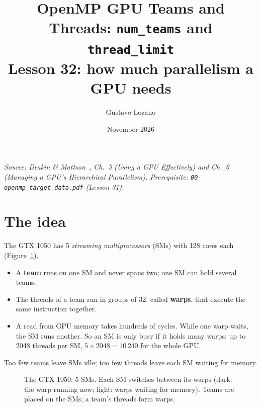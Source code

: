 \documentclass[11pt,a4paper]{article}
\title{\textbf{OpenMP GPU Teams and Threads: \texttt{num\_teams} and \texttt{thread\_limit}}\\[4pt]\large Lesson 32: how much parallelism a GPU needs}
\author{Gustavo Lozano}
\date{November 2026}
\let\origtexttt\texttt
\renewcommand{\texttt}[1]{\textcolor{black!60}{\origtexttt{#1}}}
\begin{document}
\maketitle

\noindent\textit{\small Source: Deakin \& Mattson~\cite{dm}, Ch.~5 (Using a GPU Effectively) and
Ch.~6 (Managing a GPU's Hierarchical Parallelism). Prerequisite: \texttt{00-openmp\_target\_data.pdf}
(Lesson 31).}

\section{The idea}
The GTX 1050 has 5 \emph{streaming multiprocessors} (SMs) with 128 cores each
(Figure~\ref{fig:sm}).
\begin{itemize}
  \item A \textbf{team} runs on one SM and never spans two; one SM can hold several teams.
  \item The threads of a team run in groups of 32, called \textbf{warps}, that execute the same
        instruction together.
  \item A read from GPU memory takes hundreds of cycles. While one warp waits, the SM runs
        another. So an SM is only busy if it holds many warps: up to 2048 threads per SM,
        $5\times2048 = 10\,240$ for the whole GPU.
\end{itemize}
Too few teams leave SMs idle; too few threads leave each SM waiting for memory.

\begin{figure}[H]
\centering
{}
\caption{The GTX 1050: 5 SMs. Each SM switches between its warps (dark: the warp running now;
light: warps waiting for memory). Teams are placed on the SMs; a team's threads form warps.}
\label{fig:sm}
\end{figure}
\end{document}
